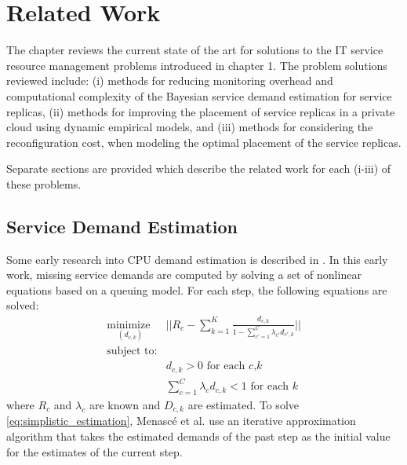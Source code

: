 

 \chapter{Related Work}      
\label{ch:state-of-art}    

The chapter reviews the current state of the art for solutions to the IT service resource management problems introduced in chapter 1.   
The problem solutions reviewed include:
   (i) methods for reducing monitoring overhead and computational complexity of the Bayesian service demand estimation for service replicas,
   (ii) methods for improving the placement of service replicas in a private cloud using dynamic empirical models, and 
   (iii) methods for considering the reconfiguration cost, when modeling the optimal placement of the service replicas.
 
   Separate sections are provided which describe the related work for each (i-iii) of these problems. 

 \section{Service Demand Estimation}   
\label{sec:service_demand_estimation} 

Some early research into CPU demand estimation is described in \cite{menasce2008computing}.
In this early work, missing service demands are computed by solving a set of nonlinear equations based on a queuing model. For each step, the following equations are solved:
 \begin{align}
 \underset{(d_{c,k})} {\text{minimize } }   & 
 || R_c-\sum_{k=1}^K \frac{d_{c,k}}{1-\sum_{c'=1}^C \lambda_{c'}d_{c',k}}||  \nonumber \\  %
 \text{subject to:}  \label{eq:simplistic_estimation} \\ 
 &  d_{c,k}>0  \text{  for each $c$,$k$} \nonumber \\ 
 & \sum_{c=1}^C \lambda_{c} d_{c,k} < 1 \text{  for each $k$} \nonumber
 \end{align}  
 where $R_c$ and $\lambda_c$ are known and $D_{c,k}$ are estimated.  
 To solve \ref{eq:simplistic_estimation}, Menasc{\'e} et al. use an iterative approximation algorithm that takes the estimated demands of the past step as the initial value for the estimates of the current step.

